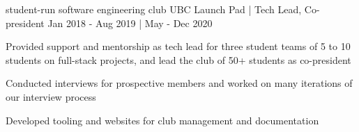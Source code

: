 \begin{cventries}

  \cventry
    {student-run software engineering club} %
    {UBC Launch Pad | Tech Lead, Co-president} %
    {} %
    {
        Jan 2018 - Aug 2019
        | May - Dec 2020
    } %
    {
      \begin{cvitems} %
        \item {Provided support and mentorship as tech lead for three student teams of 5 to 10 students on full-stack projects, and lead the club of 50+ students as co-president}
        \item {Conducted interviews for prospective members and worked on many iterations of our interview process}
        \item {Developed tooling and websites for club management and documentation}
      \end{cvitems}
    }

\iffalse
  \cventry
    {the organization behind western Canada's largest hackathon, nwHacks} %
    {nwPlus | Web Developer} %
    {\linktext{2019.nwhacks.io}} %
    {May 2018 - Sept 2018} %
    {
      \begin{cvitems} %
        \item {Implemented the nwHacks 2019 website and applicant management system used by 1000+ users}
      \end{cvitems}
    }
\fi


\end{cventries}
